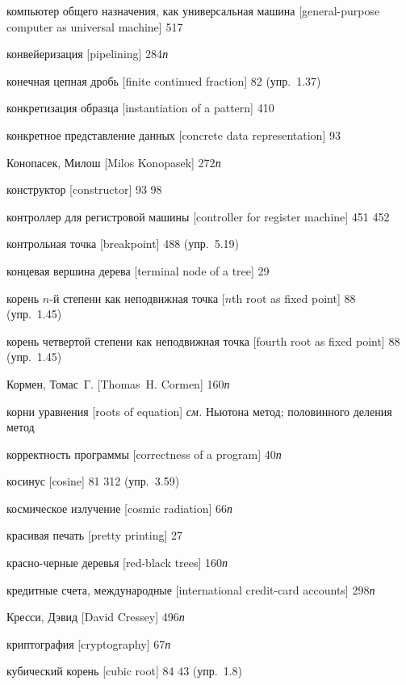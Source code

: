 \begin{theindex}
\item {компьютер общего назначения, как универсальная машина [general-purpose computer as universal machine]} 517
\item {конвейеризация [pipelining]} 284{\it п}
\item {конечная цепная дробь [finite continued fraction]} 82 (упр.~1.37)
\item {конкретизация образца [instantiation of a pattern]} 410
\item {конкретное представление данных [concrete data representation]} 93
\item {Конопасек, Милош [Milos Konopasek]} 272{\it п}
\item {конструктор [constructor]} 93
   98
\item {контроллер для регистровой машины [controller for register machine]} 451
   452
\item {контрольная точка [breakpoint]} 488 (упр.~5.19)
\item {концевая вершина дерева [terminal node of a tree]} 29
\item {корень $n$-й степени как неподвижная точка [$n$th root as fixed point]} 88 (упр.~1.45)
\item {корень четвертой степени как неподвижная точка [fourth root as fixed point]} 88 (упр.~1.45)
\item {Кормен, Томас~Г. [Thomas~H. Cormen]} 160{\it п}
\item {корни уравнения [roots of equation]} {\it см.} Ньютона метод; половинного деления метод
\item {корректность программы [correctness of a program]} 40{\it п}
\item {косинус [cosine]}
   81
   312 (упр.~3.59)
\item {космическое излучение [cosmic radiation]} 66{\it п}
\item {красивая печать [pretty printing]} 27
\item {красно-черные деревья [red-black trees]} 160{\it п}
\item {кредитные счета, международные [international credit-card accounts]} 298{\it п}
\item {Кресси, Дэвид [David Cressey]} 496{\it п}
\item {криптография [cryptography]} 67{\it п}
\item {кубический корень [cubic root]}
   84
   43 (упр.~1.8)

\end{theindex}
